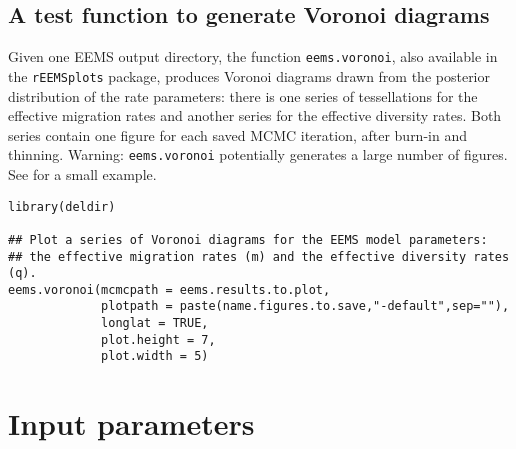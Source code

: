 \documentclass[a4paper,10pt,DIV=15,titlepage,mpinclude=true]{scrartcl}
\newcommand{\keystring}[1]{{\tt #1}}
\begin{document}
\subsection{A test function to generate Voronoi diagrams}

Given one EEMS output directory, the function \keystring{eems.voronoi}, also available in the \keystring{rEEMSplots} package, produces Voronoi diagrams drawn from the posterior distribution of the rate parameters: there is one series of tessellations for the effective migration rates and another series for the effective diversity rates. Both series contain one figure for each saved MCMC iteration, after burn-in and thinning. Warning: \keystring{eems.voronoi} potentially generates a large number of figures. See  for a small example.

\begin{lstlisting}[style=Rcode]
library(deldir)

## Plot a series of Voronoi diagrams for the EEMS model parameters:          
## the effective migration rates (m) and the effective diversity rates (q).
eems.voronoi(mcmcpath = eems.results.to.plot,
             plotpath = paste(name.figures.to.save,"-default",sep=""),
             longlat = TRUE,
             plot.height = 7,
             plot.width = 5)
\end{lstlisting}

\newpage 

\section{Input parameters}
\end{document}
